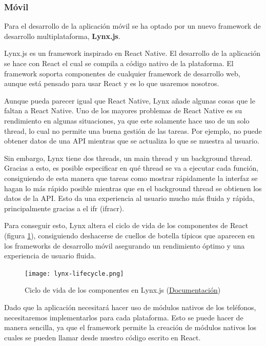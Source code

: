 \subsubsection{Móvil}
Para el desarrollo de la aplicación móvil se ha optado por un nuevo framework de desarrollo multiplataforma, \textbf{Lynx.js}.

Lynx.js es un framework inspirado en React Native. El desarrollo de la aplicación se hace con React el cual se compila a código nativo de la plataforma. El framework soporta componentes de cualquier framework de desarrollo web, aunque está pensado para usar React y es lo que usaremos nosotros.

Aunque pueda parecer igual que React Native, Lynx añade algunas cosas que le faltan a React Native. Uno de los mayores problemas de React Native es su rendimiento en algunas situaciones, ya que este solamente hace uso de un solo thread, lo cual no permite una buena gestión de las tareas. Por ejemplo, no puede obtener datos de una API mientras que se actualiza lo que se muestra al usuario.

Sin embargo, Lynx tiene dos threads, un main thread y un background thread.
Gracias a esto, es posible especificar en qué thread se va a ejecutar cada función, consiguiendo de esta manera que tareas como mostrar rápidamente la interfaz se hagan lo más rápido posible mientras que en el background thread se obtienen los datos de la API.
Esto da una experiencia al usuario mucho más fluida y rápida, principalmente gracias a el \gls{ifr} (\acrshort{ifracr}).

Para conseguir esto, Lynx altera el ciclo de vida de los componentes de React (figura \ref{fig:lynx-component-lifecycle}), consiguiendo deshacerse de cuellos de botella típicos que aparecen en los frameworks de desarrollo móvil asegurando un rendimiento óptimo y una experiencia de usuario fluida.

\begin{figure}[h]
    \begin{center}
        \texttt{[image: lynx-lifecycle.png]}
    \end{center}
    \caption{Ciclo de vida de los componentes en Lynx.js (\href{https://lynxjs.org/react/lifecycle.html}{Documentación})}
    \label{fig:lynx-component-lifecycle}
\end{figure}


Dado que la aplicación necesitará hacer uso de módulos nativos de los teléfonos, necesitaremos implementarlos para cada plataforma.
Esto se puede hacer de manera sencilla, ya que el framework permite la creación de módulos nativos los cuales se pueden llamar desde nuestro código escrito en React.

